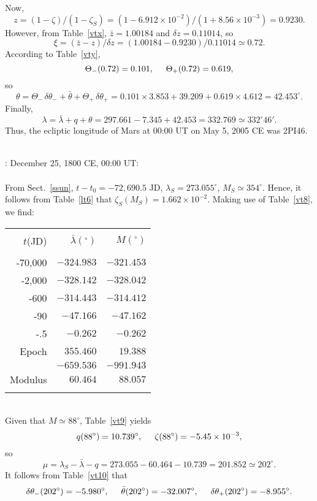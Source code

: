 Now,
$$ 
z= (1-\zeta)/(1-\zeta_S) = (1-6.912\times 10^{-2})/(1+8.56\times 10^{-3}) =
0.9230.
$$
However, from Table~\ref{vtx}, $\bar{z}= 1.00184$ and $\delta z = 0.11014$,
so
$$
\xi = (\bar{z}-z)/\delta z = (1.00184-0.9230)/0.11014 \simeq 0.72.
$$
According to Table~\ref{vty}, 
$$
\Theta_-(0.72) = 0.101, \mbox{\hspace{0.5cm}}\Theta_+(0.72) = 0.619,
$$
so
$$
\theta  = \Theta_-\,\delta\theta_- + \bar{\theta}+\Theta_+\,\delta\theta_+ = 0.101\times 3.853+39.209+0.619\times 4.612 = 42.453^\circ.
$$ 
Finally,
$$
\lambda=\bar{\lambda} + q + \theta= 297.661-7.345+42.453=332.769 \simeq 332^\circ 46'.
$$
Thus,
the ecliptic longitude of Mars at 00:00 UT on May 5, 2005 CE was 2PI46.

~\\
: December 25, 1800 CE, 00:00 UT:\\
~\\
From Sect.~\ref{ssun}, $t-t_0=-72,690.5$ JD, $\lambda_S= 273.055^\circ$, $M_S\simeq 354^\circ$. Hence, it follows from Table~\ref{lt6} that
$\zeta_S(M_S)= 1.662\times 10^{-2}$. Making use of
Table~\ref{vt8}, we find:\\
\begin{tabular}{rrr}
&&\\
$t$(JD) & $\bar{\lambda}(^\circ)$ & $ M(^\circ)$\\[-2ex]
&&\\
-70,000 & $-324.983$ & $-321.453$\\
-2,000 & $-328.142$ & $-328.042$\\
-600 & $-314.443$ & $-314.412$\\
-90 & $-47.166$ & $-47.162$\\
-.5 & $-0.262$ & $-0.262$\\
Epoch & $355.460$ & $19.388$\\\cline{2-3}
&$-659.536$ & $-991.943$\\\cline{2-3}
Modulus & $60.464$ & $88.057$\\
&&\\
\end{tabular}\\
Given that $M\simeq 88^\circ$, Table~\ref{vt9} yields 
$$
q(88^\circ)= 10.739^\circ, \mbox{\hspace{0.5cm}}\zeta(88^\circ)=-5.45\times 10^{-3},
$$
so
$$
\mu=\lambda_S - \bar{\lambda}-q = 273.055-60.464-10.739= 201.852\simeq202^\circ.
$$
It follows from Table~\ref{vt10}
that 
$$
\delta\theta_-(202^\circ) = -5.980^\circ,\mbox{\hspace{0.5cm}}\bar{\theta}(202^\circ)=-32.007^\circ,\mbox{\hspace{0.5cm}}\delta\theta_+(202^\circ) = -8.955^\circ.
$$
